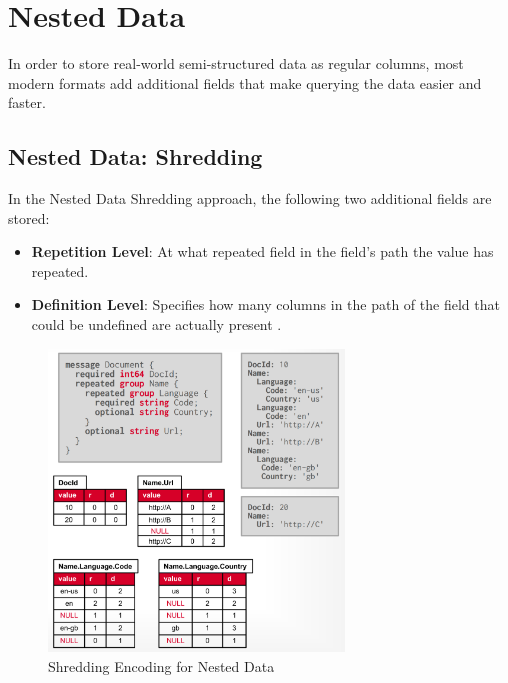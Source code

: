 \documentclass[11pt]{article}
\begin{document}
\section{Nested Data}
In order to store real-world semi-structured data as regular columns, most modern formats add additional fields that make querying the data easier and faster. 

\subsection*{Nested Data: Shredding}
In the Nested Data Shredding approach, the following two additional fields are stored:

\begin{itemize}
    \item \textbf{Repetition Level}: At what repeated field in the field's path the value has repeated.
    \item \textbf{Definition Level}: Specifies how many columns in the path of the field that could be undefined are actually present \cite{Dremel}.
\end{itemize}

\begin{figure}[htbp]
    \centering
    \includegraphics[width=0.7\textwidth]{fig/nested-data-encoding.pdf}
    \caption{Shredding Encoding for Nested Data}
\end{figure}
\end{document}
